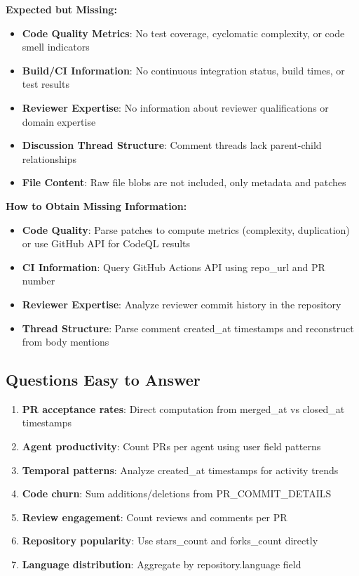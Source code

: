 \documentclass[11pt]{article}
\begin{document}
\textbf{Expected but Missing:}
\begin{itemize}
    \item \textbf{Code Quality Metrics}: No test coverage, cyclomatic complexity, or code smell indicators
    \item \textbf{Build/CI Information}: No continuous integration status, build times, or test results
    \item \textbf{Reviewer Expertise}: No information about reviewer qualifications or domain expertise
    \item \textbf{Discussion Thread Structure}: Comment threads lack parent-child relationships
    \item \textbf{File Content}: Raw file blobs are not included, only metadata and patches
\end{itemize}

\textbf{How to Obtain Missing Information:}
\begin{itemize}
    \item \textbf{Code Quality}: Parse patches to compute metrics (complexity, duplication) or use GitHub API for CodeQL results
    \item \textbf{CI Information}: Query GitHub Actions API using repo\_url and PR number
    \item \textbf{Reviewer Expertise}: Analyze reviewer commit history in the repository
    \item \textbf{Thread Structure}: Parse comment created\_at timestamps and reconstruct from body mentions
\end{itemize}

\subsection{Questions Easy to Answer}

\begin{enumerate}
    \item \textbf{PR acceptance rates}: Direct computation from merged\_at vs closed\_at timestamps
    \item \textbf{Agent productivity}: Count PRs per agent using user field patterns
    \item \textbf{Temporal patterns}: Analyze created\_at timestamps for activity trends
    \item \textbf{Code churn}: Sum additions/deletions from PR\_COMMIT\_DETAILS
    \item \textbf{Review engagement}: Count reviews and comments per PR
    \item \textbf{Repository popularity}: Use stars\_count and forks\_count directly
    \item \textbf{Language distribution}: Aggregate by repository.language field
\end{enumerate}
\end{document}
